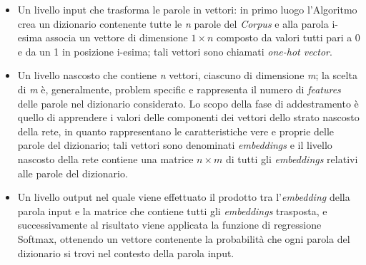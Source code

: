 \begin{itemize}
    \item Un livello input che trasforma le parole in vettori: in primo luogo l'Algoritmo crea un dizionario contenente tutte le \emph{n} parole del \emph{Corpus} e alla parola i-esima associa un vettore di dimensione \emph{$1\times n$} composto da valori tutti pari a 0 e da un 1 in posizione i-esima; tali vettori sono chiamati \emph{one-hot vector}. 
    \item Un livello nascosto che contiene \emph{n} vettori, ciascuno di dimensione \emph{m}; la scelta di \emph{m} è, generalmente, problem specific e rappresenta il numero di \emph{features} delle parole nel dizionario considerato. Lo scopo della fase di addestramento è quello di apprendere i valori delle componenti dei vettori dello strato nascosto della rete, in quanto rappresentano le caratteristiche vere e proprie delle parole del dizionario; tali vettori sono denominati \emph{embeddings} e il livello nascosto della rete contiene una matrice \emph{$n \times m$} di tutti gli \emph{embeddings} relativi alle parole del dizionario.
    \item Un livello output nel quale viene effettuato il prodotto tra l'\emph{embedding} della parola input e la matrice che contiene tutti gli \emph{embeddings} trasposta, e successivamente al risultato viene applicata la funzione di regressione Softmax, ottenendo un vettore contenente la probabilità che ogni parola del dizionario si trovi nel contesto della parola input.
\end{itemize} 

